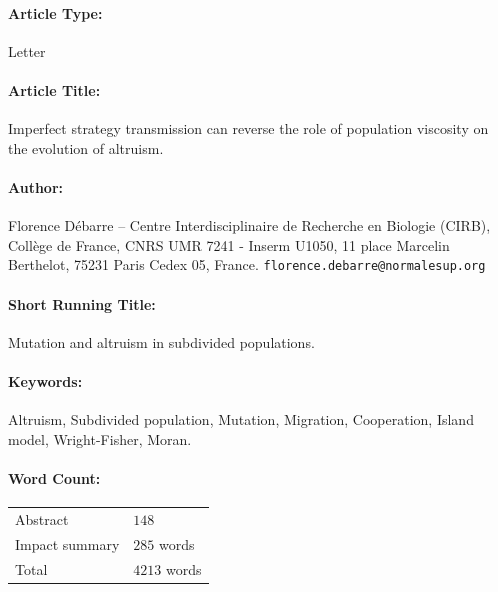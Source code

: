 \documentclass[11pt, letterpaper]{article}
\begin{document}
\pagestyle{maintext}


\paragraph{Article Type:} Letter

\paragraph{Article Title:} Imperfect strategy transmission can reverse the role of population viscosity on the evolution of altruism.

\paragraph{Author:} Florence D\'ebarre -- Centre Interdisciplinaire de Recherche en Biologie (CIRB), Coll\`ege de France, CNRS UMR 7241 - Inserm U1050, 11 place Marcelin Berthelot, 75231 Paris Cedex 05, France. \texttt{florence.debarre@normalesup.org}

\paragraph{Short Running Title:} Mutation and altruism in subdivided populations.

\paragraph{Keywords:} Altruism, Subdivided population, Mutation, Migration, Cooperation, Island model, Wright-Fisher, Moran.

\paragraph{Word Count:}
\begin{tabular}[t]{ll}
Abstract & $148$ \\
Impact summary & $285$ words \\
Total & $4213$ words
\end{tabular}


\end{document}
